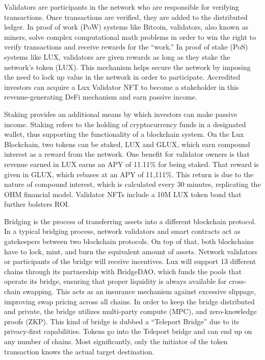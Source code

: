 \documentclass[11pt]{article}
\begin{document}
Validators are participants in the network who are responsible for verifying transactions. Once transactions are verified, they are added to the distributed ledger. In proof of work (PoW) systems like Bitcoin, validators, also known as miners, solve complex computational math problems in order to win the right to verify transactions and receive rewards for the ``work.'' In proof of stake (PoS) systems like LUX, validators are given rewards as long as they stake the network's token (LUX). This mechanism helps secure the network by imposing the need to lock up value in the network in order to participate. Accredited investors can acquire a Lux Validator NFT to become a stakeholder in this revenue-generating DeFi mechanism and earn passive income.


Staking provides an additional means by which investors can make passive income. Staking refers to the holding of cryptocurrency funds in a designated wallet, thus supporting the functionality of a blockchain system. On the Lux Blockchain, two tokens can be staked, LUX and GLUX, which earn compound interest as a reward from the network. One benefit for validator owners is that revenue earned in LUX earns an APY of 11.11\% for being staked. That reward is given in GLUX, which rebases at an APY of 11,111\%. This return is due to the nature of compound interest, which is calculated every 30 minutes, replicating the OHM financial model. Validator NFTs include a 10M LUX token bond that further bolsters ROI.


Bridging is the process of transferring assets into a different blockchain protocol. In a typical bridging process, network validators and smart contracts act as gatekeepers between two blockchain protocols. On top of that, both blockchains have to lock, mint, and burn the equivalent amount of assets. Network validators or participants of the bridge will receive incentives. Lux will support 13 different chains through its partnership with BridgeDAO, which funds the pools that operate its bridge, ensuring that proper liquidity is always available for cross-chain swapping. This acts as an insurance mechanism against excessive slippage, improving swap pricing across all chains. In order to keep the bridge distributed and private, the bridge utilizes multi-party compute (MPC), and zero-knowledge proofs (ZKP). This kind of bridge is dubbed a ``Teleport Bridge'' due to its privacy-first capabilities. Tokens go into the Teleport bridge and can end up on any number of chains. Most significantly, only the initiator of the token transaction knows the actual target destination.
\end{document}
